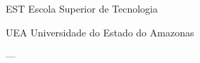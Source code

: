 \documentclass[
	12pt,				%
	openright,			%
	oneside,			%
	a4paper,			%
	chapter=TITLE,		%
	english,			%
	french,				%
	spanish,			%
	brazil,				%
	article,			%
	]{uea-abntex2}
\begin{document}
\frenchspacing 


\imprimircapa

\imprimirfolhaderosto




\begin{siglas}
  \item[EST] Escola Superior de Tecnologia
  \item[UEA] Universidade do Estado do Amazonas 
\end{siglas}
 ---

\renewcommand{\contentsname}{\vspace*{3.4cm}SUMÁRIO}
\tableofcontents*


\textual
\pagestyle{simple}
\end{document}
